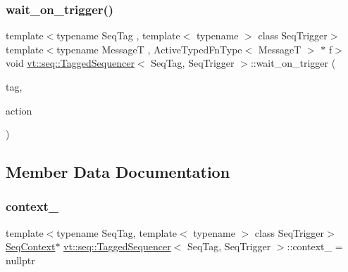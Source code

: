 \mbox{\label{structvt_1_1seq_1_1_tagged_sequencer_a7d2d5815ae147f286006419aa3180020}} 
\subsubsection{\texorpdfstring{wait\+\_\+on\+\_\+trigger()}{wait\_on\_trigger()}}
{\footnotesize\ttfamily template$<$typename Seq\+Tag , template$<$ typename $>$ class Seq\+Trigger$>$ \\
template$<$typename MessageT , Active\+Typed\+Fn\+Type$<$ Message\+T $>$ $\ast$ f$>$ \\
void \hyperlink{structvt_1_1seq_1_1_tagged_sequencer}{vt\+::seq\+::\+Tagged\+Sequencer}$<$ Seq\+Tag, Seq\+Trigger $>$\+::wait\+\_\+on\+\_\+trigger (\begin{DoxyParamCaption}\item[{\hyperlink{namespacevt_a84ab281dae04a52a4b243d6bf62d0e52}{Tag\+Type} const \&}]{tag,  }\item[{\hyperlink{structvt_1_1seq_1_1_tagged_sequencer_a0210dbd34288d440e0cd51db9d6637bd}{Seq\+Action\+Type}$<$ MessageT $>$}]{action }\end{DoxyParamCaption})}



\subsection{Member Data Documentation}
\mbox{\label{structvt_1_1seq_1_1_tagged_sequencer_a57d1b3af64ea25946f7431237ee1acd8}} 
\subsubsection{\texorpdfstring{context\+\_\+}{context\_}}
{\footnotesize\ttfamily template$<$typename Seq\+Tag, template$<$ typename $>$ class Seq\+Trigger$>$ \\
\hyperlink{structvt_1_1seq_1_1_seq_context}{Seq\+Context}$\ast$ \hyperlink{structvt_1_1seq_1_1_tagged_sequencer}{vt\+::seq\+::\+Tagged\+Sequencer}$<$ Seq\+Tag, Seq\+Trigger $>$\+::context\+\_\+ = nullptr\hspace{0.3cm}{\ttfamily [protected]}}


